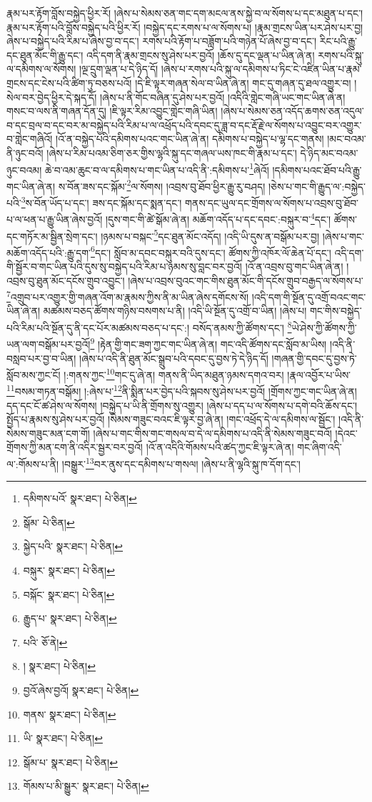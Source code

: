 རྣམ་པར་རྟོག་བློས་བསྐྱེད་ཕྱིར་རོ། །ཞེས་པ་སེམས་ཅན་གང་དག་མངལ་ནས་སྐྱེ་བ་ལ་སོགས་པ་དང་མཐུན་པ་དང་། རྣམ་པར་རྟོག་པའི་བློས་བསྐྱེད་པའི་ཕྱིར་རོ། །བསྐྱེད་དང་རགས་པ་ལ་སོགས་པ། །རྣམ་གྲངས་ཡིན་པར་ཤེས་པར་བྱ། ཞེས་པ་བསྐྱེད་པའི་རིམ་པ་ཞེས་བྱ་བ་དང་། རགས་པའི་རྟོག་པ་བཟློག་པའི་གཉེན་པོ་ཞེས་བྱ་བ་དང་། རིང་པའི་རྒྱུ་དང་ཐུན་མོང་གི་རྒྱུ་དང་། འདི་དག་ནི་རྣམ་གྲངས་སུ་ཤེས་པར་བྱའོ། །ཆོས་དུ་དང་ལྡན་པ་ཡིན་ཞེ་ན། རགས་པའི་སྐུ་ལ་དམིགས་ལ་སོགས། །ལྔ་དྲུག་ལྡན་པ་དེ་ཉིད་དོ། །ཞེས་པ་རགས་པའི་སྐུ་ལ་དམིགས་པ་ཏིང་ངེ་འཛིན་ཡིན་པ་རྣམ་གྲངས་དང་ངེས་པའི་ཚིག་ཏུ་བཅས་པའོ། །དེ་ཇི་ལྟར་གཞན་སེལ་བ་ཡིན་ཞེ་ན། གང་དུ་གཞན་དུ་ཐལ་འགྱུར་བ། །སེལ་བར་བྱེད་ཕྱིར་དེ་སྐད་དོ། །ཞེས་པ་ནི་གོང་བཞིན་དུ་ཤེས་པར་བྱའོ། །འདིའི་གླེང་གཞི་ཡང་གང་ཡིན་ཞེ་ན། གསང་བ་ལས་ནི་གཞན་དོན་དུ། །ཇི་ལྟར་རིམ་འབྱུང་གླེང་གཞི་ཡིན། །ཞེས་པ་སེམས་ཅན་འདོད་ཆགས་ཅན་འདུལ་བ་དང་བྲལ་བ་དང་བར་མ་བསྐྱེད་པའི་རིམ་པ་ལ་འཕྲོད་པའི་དབང་དུ་ཟླ་བ་དང་རྡོ་རྗེ་ལ་སོགས་པ་འབྱུང་བར་འགྱུར་བ་གླེང་གཞིའོ། །འོ་ན་བསྐྱེད་པའི་དམིགས་པའང་གང་ཡིན་ཞེ་ན། དམིགས་པ་བསྐྱེད་པ་ལྷ་དང་གནས། །མང་བའམ་ནི་ཉུང་བའོ། །ཞེས་པ་རིམ་པའམ་ཅིག་ཅར་གྱིས་ལྷའི་སྐུ་དང་གཞལ་ཡས་ཁང་གི་རྣམ་པ་དང་། དེ་ཉིད་མང་བའམ་ཉུང་བའམ། ཆེ་བ་འམ་ཆུང་བ་ལ་དམིགས་པ་གང་ཡིན་པ་འདི་ནི་:དམིགས་པ་\footnote{དམིགས་པའོ་  སྣར་ཐང་།  པེ་ཅིན། }ཞེའོ། །དམིགས་པའང་ཐོབ་པའི་རྒྱུ་གང་ཡིན་ཞེ་ན། ས་བོན་ཟས་དང་སྐོམ་\footnote{སྒོམ་  པེ་ཅིན། }ལ་སོགས། །འབྲས་བུ་ཐོབ་ཕྱིར་རྒྱུ་རུ་བཤད། །ཅེས་པ་གང་གི་རྒྱུད་ལ་:བསྐྱེད་པའི་\footnote{སྐྱེད་པའི་  སྣར་ཐང་།  པེ་ཅིན། }ས་བོན་ཡོད་པ་དང་། ཟས་དང་སྐོམ་དང་སྨན་དང་། གནས་དང་ཡུལ་དང་གྲོགས་ལ་སོགས་པ་འབྲས་བུ་ཐོབ་པ་ལ་ཕན་པ་རྒྱུ་ཡིན་ཞེས་བྱའོ། །དུས་གང་གི་ཚེ་སྒོམ་ཞེ་ན། མཆོག་འདོད་པ་དང་དབང་:བསྐུར་བ་\footnote{བསྐུར་  སྣར་ཐང་།  པེ་ཅིན། }དང་། ཚོགས་དང་གཏོར་མ་སྦྱིན་སྲེག་དང་། །ཉམས་པ་བསྐང་\footnote{བསྐོང་  སྣར་ཐང་།  པེ་ཅིན། }དང་ཐུན་མོང་འདོད། །འདི་ཡི་དུས་ན་བསྒོམ་པར་བྱ། །ཞེས་པ་གང་མཆོག་འདོད་པའི་:རྒྱུ་དག་\footnote{རྒྱུད་པ་  སྣར་ཐང་།  པེ་ཅིན། }དང་། སློབ་མ་དབང་བསྐུར་བའི་དུས་དང་། ཚོགས་ཀྱི་འཁོར་ལོ་ཆེན་པོ་དང་། འདི་དག་གི་སྦྱོར་བ་གང་ཡིན་པའི་དུས་སུ་བསྐྱེད་པའི་རིམ་པ་ཉམས་སུ་བླང་བར་བྱའོ། །འོ་ན་འབྲས་བུ་གང་ཡིན་ཞེ་ན། །འབྲས་བུ་ཐུན་མོང་དངོས་གྲུབ་འབྱུང་། །ཞེས་པ་འབྲས་བུའང་གང་གིས་ཐུན་མོང་གི་དངོས་གྲུབ་བརྒྱད་ལ་སོགས་པ་\footnote{པའི་  ཅོ་ནེ། }འགྲུབ་པར་འགྱུར་གྱི་གཞན་འོག་མ་རྣམས་ཀྱིས་ནི་མ་ཡིན་ཞེས་དགོངས་སོ། །འདི་དག་གི་སྔོན་དུ་འགྲོ་བའང་གང་ཡིན་ཞེ་ན། མཚམས་བཅད་ཚོགས་གཉིས་བསགས་པ་ནི། །འདི་ཡི་སྔོན་དུ་འགྲོ་བ་ཡིན། །ཞེས་པ། གང་གིས་བསྐྱེད་པའི་རིམ་པའི་སྔོན་དུ་ནི་དང་པོར་མཚམས་བཅད་པ་དང་:། བསོད་ནམས་ཀྱི་ཚོགས་དང་། \footnote{།    སྣར་ཐང་།  པེ་ཅིན། }ཡེ་ཤེས་ཀྱི་ཚོགས་ཀྱི་ཡན་ལག་བསྒོམ་པར་བྱའོ།\footnote{བྱའོ་ཞེས་བྱའོ།  སྣར་ཐང་།  པེ་ཅིན། } །རྟེན་གྱི་གང་ཟག་ཀྱང་གང་ཡིན་ཞེ་ན། གང་འདི་ཚོགས་དང་སློབ་མ་ཡིས། །འདི་ནི་བསླབ་པར་བྱ་བ་ཡིན། །ཞེས་པ་འདི་ནི་ཐུན་མོང་སྒྲུབ་པའི་དབང་དུ་བྱས་ཏེ་དེ་ཉིད་དོ། །གཞན་གྱི་དབང་དུ་བྱས་ཏེ་སློབ་མས་ཀྱང་ངོ། །:གནས་ཀྱང་\footnote{གནས་  སྣར་ཐང་།  པེ་ཅིན། }གང་དུ་ཞེ་ན། གནས་ནི་ཡིད་མཐུན་ཉམས་དགའ་བར། །རྣལ་འབྱོར་པ་ཡིས་\footnote{ཡི་  སྣར་ཐང་།  པེ་ཅིན། }བསམ་གཏན་བསྒོམ། །:ཞེས་པ་\footnote{སྒོམ་པ་  སྣར་ཐང་།  པེ་ཅིན། }ནི་སྨིན་པར་བྱེད་པའི་སྐབས་སུ་ཤེས་པར་བྱའོ། །གྲོགས་ཀྱང་གང་ཡིན་ཞེ་ན། དད་དང་ངོ་ཚ་ཤེས་ལ་སོགས། །བསྐྱེད་པ་ཡི་ནི་གྲོགས་སུ་འགྱུར། །ཞེས་པ་དད་པ་ལ་སོགས་པ་དགེ་བའི་ཆོས་དང་། སྤྱོད་པ་རྣམས་སུ་ཤེས་པར་བྱའོ། །སེམས་གཟུང་བའང་ཇི་ལྟར་བྱ་ཞེ་ན། །གང་འཕྲོད་དེ་ལ་དམིགས་ལ་སྦྱོང་། །འདི་ནི་སེམས་གཟུང་མན་ངག་གོ། །ཞེས་པ་གང་གིས་གང་གསལ་བ་དེ་ལ་དམིགས་པ་འདི་ནི་སེམས་གཟུང་བའོ། །དེའང་གྲོགས་ཀྱི་མན་ངག་ནི་འདིར་སྦྱར་བར་བྱའོ། །འོ་ན་འདིའི་གོམས་པའི་ཚད་ཀྱང་ཇི་ལྟར་ཞེ་ན། གང་ཞིག་འདི་ལ་:གོམས་པ་ནི། །བསྒྱུར་\footnote{གོམས་པ་མི་སྒྱུར་  སྣར་ཐང་།  པེ་ཅིན། }བར་ནུས་དང་དམིགས་པ་གསལ། །ཞེས་པ་ནི་ལྷའི་སྐུ་ཁ་དོག་དང་། 